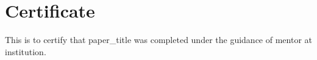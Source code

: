 \section*{Certificate}
This is to certify that {{paper_title}} was completed under the guidance of {{mentor}} at {{institution}}.
